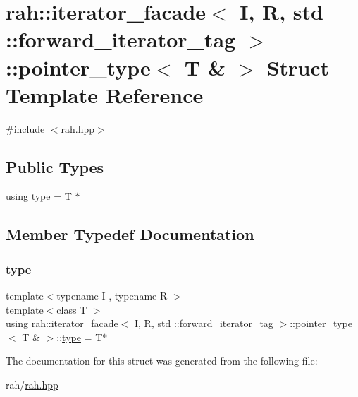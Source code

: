\hypertarget{structrah_1_1iterator__facade_3_01_i_00_01_r_00_01std_01_1_1forward__iterator__tag_01_4_1_1pointer__type_3_01_t_01_6_01_4}{}\section{rah\+::iterator\+\_\+facade$<$ I, R, std \+::forward\+\_\+iterator\+\_\+tag $>$\+::pointer\+\_\+type$<$ T \& $>$ Struct Template Reference}
\label{structrah_1_1iterator__facade_3_01_i_00_01_r_00_01std_01_1_1forward__iterator__tag_01_4_1_1pointer__type_3_01_t_01_6_01_4}


{\ttfamily \#include $<$rah.\+hpp$>$}

\subsection*{Public Types}
\begin{DoxyCompactItemize}
\item 
using \mbox{\hyperlink{structrah_1_1iterator__facade_3_01_i_00_01_r_00_01std_01_1_1forward__iterator__tag_01_4_1_1pointer__type_3_01_t_01_6_01_4_ab3c8d96b3dedfcf07cab8889136ca353}{type}} = T $\ast$
\end{DoxyCompactItemize}


\subsection{Member Typedef Documentation}
\mbox{\label{structrah_1_1iterator__facade_3_01_i_00_01_r_00_01std_01_1_1forward__iterator__tag_01_4_1_1pointer__type_3_01_t_01_6_01_4_ab3c8d96b3dedfcf07cab8889136ca353}} 
\subsubsection{\texorpdfstring{type}{type}}
{\footnotesize\ttfamily template$<$typename I , typename R $>$ \\
template$<$class T $>$ \\
using \mbox{\hyperlink{structrah_1_1iterator__facade}{rah\+::iterator\+\_\+facade}}$<$ I, R, std \+::forward\+\_\+iterator\+\_\+tag $>$\+::pointer\+\_\+type$<$ T \& $>$\+::\mbox{\hyperlink{structrah_1_1iterator__facade_3_01_i_00_01_r_00_01std_01_1_1forward__iterator__tag_01_4_1_1pointer__type_3_01_t_01_6_01_4_ab3c8d96b3dedfcf07cab8889136ca353}{type}} =  T$\ast$}



The documentation for this struct was generated from the following file\+:\begin{DoxyCompactItemize}
\item 
rah/\mbox{\hyperlink{rah_8hpp}{rah.\+hpp}}\end{DoxyCompactItemize}
